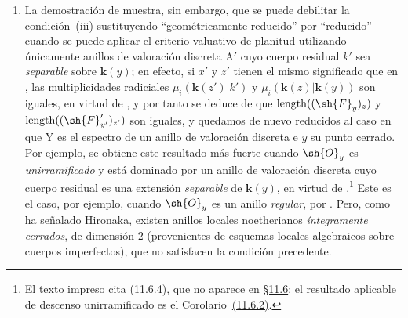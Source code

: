 \begin{remarks}[15.2.4]
\begin{enumerate}[label=(\roman*)]
Para construir los anillos $\mathrm{A}$ y $\mathrm{A}'$, partamos de un cuerpo imperfecto $k$ de característica $p>0$; sea $\mathrm{K}_0=k((\mathrm{T}))$ el cuerpo de series formales de Laurent sobre $k$, y sea $\mathrm{A}_0$ su anillo de valoración para la valoración discreta dada por el orden de una serie formal de Laurent; el cuerpo residual de $\mathrm{A}_0$ es, pues, $k$.
Sea $\alpha$ un elemento de $k$ que no es una potencia $p$-ésima, y tomemos $k'=k(\alpha^{1/p})$; $\mathrm{K}=k'((\mathrm{T}))$ es entonces una extensión radicial finita de $\mathrm{K}_0$, y $\mathrm{A}'=\mathrm{A}_0\otimes_k k'$ es el anillo de valoración discreta de $\mathrm{K}$.
Si $\mathfrak{m}'$ es el ideal maximal de $\mathrm{A}'$, las condiciones~$1)$ y $2)$ se satisfacen tomando $\mathrm{A}=\mathrm{A}_0+\mathfrak{m}'$: en efecto, como $\mathrm{A}_0$ es noetheriano y $\mathrm{A}'$ es un $\mathrm{A}_0$-módulo de tipo finito, $\mathrm{A}$ es una $\mathrm{A}_0$-álgebra finita, y por tanto un anillo noetheriano; como $\mathrm{A}'$ es finito sobre $\mathrm{A}$, $\mathfrak{m}'$ es el único ideal maximal de $\mathrm{A}$, que es así un anillo local completo, evidentemente de dimensión $1$ (por ser finito sobre $\mathrm{A}_0$) y geométricamente unirramificado, puesto que $\mathrm{A}'$ es íntegramente cerrado y tiene el mismo cuerpo de fracciones $\mathrm{K}$ que $\mathrm{A}$.
  \item La demostración de  muestra, sin embargo, que se puede debilitar la condición~(iii) sustituyendo ``geométricamente reducido'' por ``reducido'' cuando se puede aplicar el criterio valuativo de planitud  utilizando únicamente anillos de valoración discreta $\mathrm{A}'$ cuyo cuerpo residual $k'$ sea \emph{separable} sobre $\boldsymbol{k}(y)$; en efecto, si $x'$ y $z'$ tienen el mismo significado que en , las multiplicidades radiciales $\mu_i(\boldsymbol{k}(z')|k')$ y $\mu_i(\boldsymbol{k}(z)|\boldsymbol{k}(y))$ son iguales, en virtud de , y por tanto se deduce de  que $\operatorname{length}((\sh{F}_y)_z)$ y $\operatorname{length}((\sh{F}_{y'}')_{z'})$ son iguales, y quedamos de nuevo reducidos al caso en que $\mathrm{Y}$ es el espectro de un anillo de valoración discreta e $y$ su punto cerrado.
Por ejemplo, se obtiene este resultado más fuerte cuando $\sh{O}_y$ es \emph{unirramificado} y está dominado por un anillo de valoración discreta cuyo cuerpo residual es una extensión \emph{separable} de $\boldsymbol{k}(y)$, en virtud de .\footnote{El texto impreso cita (11.6.4), que no aparece en {\hyperlink{ega4.c04.subsec.11-6}{\S11.6}}; el resultado aplicable de descenso unirramificado es el Corolario~{\hyperlink{ega4.c04.cor.11-6-2}{(11.6.2)}}.}
Este es el caso, por ejemplo, cuando $\sh{O}_y$ es un anillo \emph{regular}, por .
Pero, como ha señalado Hironaka, existen anillos locales noetherianos \emph{íntegramente cerrados}, de dimensión $2$ (provenientes de esquemas locales algebraicos sobre cuerpos imperfectos), que no satisfacen la condición precedente.
\end{enumerate}
\end{remarks}

